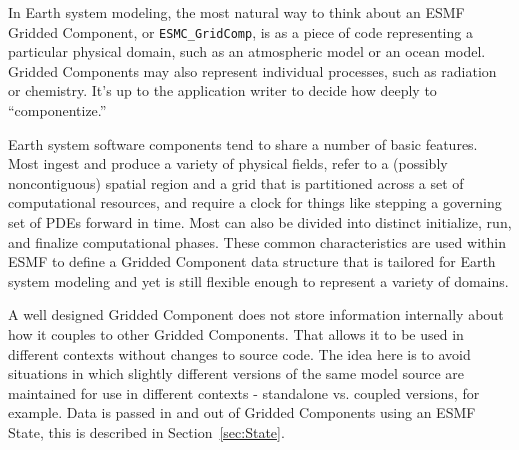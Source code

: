 %


\label{sec:GridComp}

In Earth system modeling, the most natural way to think about an ESMF 
Gridded Component, or {\tt ESMC\_GridComp}, is as a piece of code 
representing a particular physical domain, such as an atmospheric 
model or an ocean model.  Gridded Components may also represent individual
processes, such as radiation or chemistry.  It's up to the application
writer to decide how deeply to ``componentize.''

Earth system software components tend to share a number of basic 
features.  Most ingest and produce a variety of physical fields, refer to 
a (possibly noncontiguous) spatial region and a grid that is 
partitioned across a set of computational resources, and require 
a clock for things like stepping a governing set of PDEs forward in time.  
Most can also be divided into distinct initialize, run, and finalize 
computational phases.  These common characteristics are used 
within ESMF to define a Gridded Component data structure that 
is tailored for Earth system modeling and yet is still flexible
enough to represent a variety of domains.

A well designed Gridded Component does not store information 
internally about how it couples to other Gridded Components.  That
allows it to be used in different contexts without changes to source
code.  The idea here is to avoid situations in which slightly
different versions of the same model source are maintained for use in 
different contexts - standalone vs. coupled versions, for example.
Data is passed in and out of Gridded Components using an ESMF State,
this is described in Section~\ref{sec:State}.


